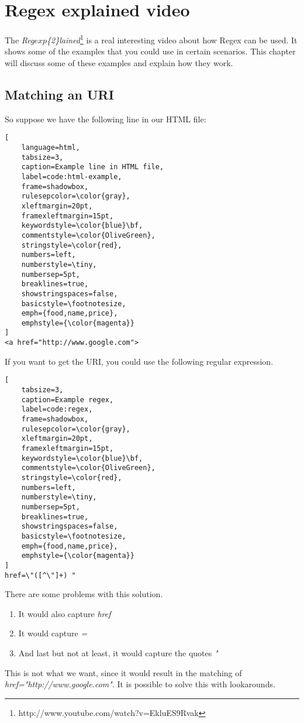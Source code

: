 \chapter{Regex explained video}
\label{chap:regex-explained}

The \textit{Reg\(exp\)\{2\}lained}\footnote{http://www.youtube.com/watch?v=EkluES9Rvak}  is a real interesting video about how Regex can be used. It shows some of the examples that you could use in certain scenarios. This chapter will discuss some of these examples and explain how they work.

\section{Matching an URI}
\label{sec:matching-an-uri}
So suppose we have the following line in our HTML file:
\begin{lstlisting}[
	language=html,
	tabsize=3,
	caption=Example line in HTML file,
	label=code:html-example,
	frame=shadowbox,
	rulesepcolor=\color{gray},
	xleftmargin=20pt,
	framexleftmargin=15pt,
	keywordstyle=\color{blue}\bf,
	commentstyle=\color{OliveGreen},
	stringstyle=\color{red},
	numbers=left,
	numberstyle=\tiny,
	numbersep=5pt,
	breaklines=true,
	showstringspaces=false,
	basicstyle=\footnotesize,
	emph={food,name,price},
	emphstyle={\color{magenta}}
]
<a href="http://www.google.com">
\end{lstlisting}

If you want to get the URI, you could use the following regular expression.
\begin{lstlisting}[
	tabsize=3,
	caption=Example regex,
	label=code:regex,
	frame=shadowbox,
	rulesepcolor=\color{gray},
	xleftmargin=20pt,
	framexleftmargin=15pt,
	keywordstyle=\color{blue}\bf,
	commentstyle=\color{OliveGreen},
	stringstyle=\color{red},
	numbers=left,
	numberstyle=\tiny,
	numbersep=5pt,
	breaklines=true,
	showstringspaces=false,
	basicstyle=\footnotesize,
	emph={food,name,price},
	emphstyle={\color{magenta}}
]
href=\"([^\"]+) "
\end{lstlisting}
There are some problems with this solution.
\begin{enumerate}
\item It would also capture \textit{href}
\item It would capture \textit{=}
\item And last but not at least, it would capture the quotes \textit{"}
\end{enumerate}
This is not what we want, since it would result in the matching of \textit{href="http://www.google.com"}. It is possible to solve this with lookarounds.

